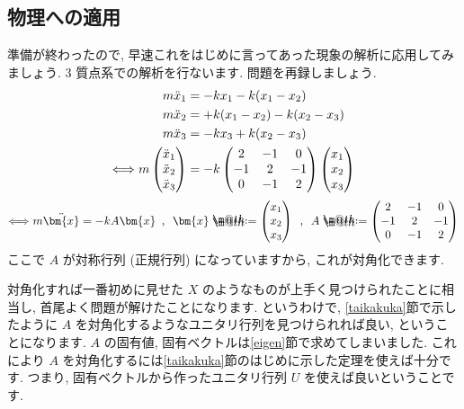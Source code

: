 \documentclass[openany, a4paper, oneside]{jsbook}
\makeatletter
\newcommand*{\defeq}{\mathrel{\rlap{%
\raisebox{0.3ex}{$\m@th\cdot$}}%
\raisebox{-0.3ex}{$\m@th\cdot$}}%
=}
\theoremstyle{break}
\theoremstyle{breakdefn}
\makeatother
\begin{document}
\subsection{物理への適用}


準備が終わったので, 早速これをはじめに言ってあった現象の解析に応用してみましょう.
3 質点系での解析を行ないます. 問題を再録しましょう.
    \begin{align}
        m\ddot{x}_{1} &= -kx_1 - k (x_1 - x_2 ) \notag \\
        m\ddot{x}_{2} &= + k (x_1 - x_2 ) - k (x_2 - x_3) \notag \\
        m\ddot{x}_{3} &= -kx_3 +k (x_2 - x_3 )  \notag \\
        \Longleftrightarrow
        m \begin{pmatrix} \ddot{x}_{1} \\ \ddot{x}_{2} \\ \ddot{x}_{3} \end{pmatrix}
        &= -k \begin{pmatrix} 2 & -1 & 0 \\ -1 & 2 & -1 \\ 0 & -1 & 2 \end{pmatrix}
        \begin{pmatrix} x_{1} \\ x_{2} \\ x_{3} \end{pmatrix} \notag
    \end{align}
    \begin{align}
        \Longleftrightarrow
        m \ddot{\bm{x}} = -k A \bm{x} \,\,\, , \,\,\,
        \bm{x} \defeq \begin{pmatrix} x_1 \\ x_2 \\ x_3 \end{pmatrix} \,\,\, , \,\,\,
        A \defeq \begin{pmatrix} 2 & -1 & 0 \\ -1 & 2 & -1 \\ 0 & -1 & 2 \end{pmatrix} \notag
    \end{align}
ここで $A$ が対称行列 (正規行列) になっていますから, これが対角化できます.

対角化すれば一番初めに見せた $X$ のようなものが上手く見つけられたことに相当し, 首尾よく問題が解けたことになります.
というわけで, \ref{taikakuka}節で示したように $A$ を対角化するようなユニタリ行列を見つけられれば良い, ということになります.
 $A$ の固有値, 固有ベクトルは\ref{eigen}節で求めてしまいました.
これにより $A$ を対角化するには\ref{taikakuka}節のはじめに示した定理を使えば十分です.
つまり, 固有ベクトルから作ったユニタリ行列 $U$ を使えば良いということです.
\end{document}
